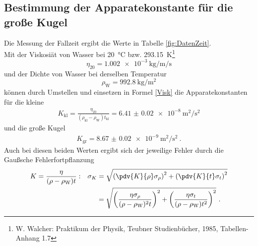 \subsection{Bestimmung der Apparatekonstante für die große Kugel}
Die Messung der Fallzeit ergibt die Werte in Tabelle \ref{fig:DatenZeit}.
 \\
Mit der Viskosiät von Wasser bei \SI{20}{\celsius} bzw. \SI{293.15}{\kelvin}\footnote[3]{W. Walcher: Praktikum der Physik, Teubner Studienbücher, 1985, Tabellen-Anhang 1.7}
\[ \eta_{20} = \SI{1.002e-3}{\kilo\gram\per\metre\per\second} \]
und der Dichte von Wasser bei derselben Temperatur\footnotemark[3]
\[ \rho_\text{W} = \SI{992.8}{\kilo\gram\per\metre\squared} \]
können durch Umstellen und einsetzen in Formel \eqref{Visk} die Apparatekonstanten für die kleine
\begin{align}
	K_\text{kl} = \frac{\eta_{20}}{(\rho_\text{kl}-\rho_\text{W})t_\text{kl}} = \SI{6.41(2)e-8}{\metre\squared\per\second\squared}
\end{align}
und die große Kugel
\begin{align}
	K_\text{gr} = \SI{8.67(2)e-9}{\metre\squared\per\second\squared} \ .
\end{align}
Auch bei diesen beiden Werten ergibt sich der jeweilige Fehler durch die Gaußsche Fehlerfortpflanzung
\begin{align}
	K &= \frac{\eta}{(\rho-\rho_\text{W})t}: && \sigma_K = \sqrt{\left(\pdv{K}{\rho}\sigma_\rho\right)^2+\left(\pdv{K}{t}\sigma_t\right)^2} \\
	& && \quad\ = \sqrt{\left(\frac{\eta\sigma_\rho}{(\rho-\rho_\text{W})^2t}\right)^2+\left(\frac{\eta\sigma_t}{(\rho-\rho_\text{W})t^2}\right)^2} \ .
\end{align}
\clearpage

